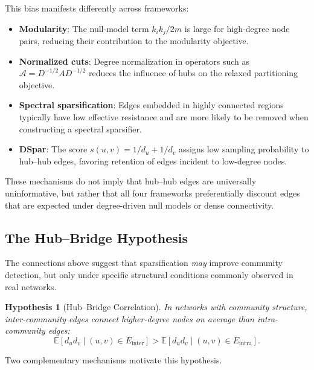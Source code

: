 \documentclass[10pt,journal,compsoc]{IEEEtran}
\newtheorem{hypothesis}{Hypothesis}
\begin{document}
This bias manifests differently across frameworks:
\begin{itemize}
    \item \textbf{Modularity}: The null-model term $k_i k_j / 2m$ is large for
    high-degree node pairs, reducing their contribution to the modularity
    objective.
    \item \textbf{Normalized cuts}: Degree normalization in operators such as
    $\mathcal{A} = D^{-1/2} A D^{-1/2}$ reduces the influence of hubs on the
    relaxed partitioning objective.
    \item \textbf{Spectral sparsification}: Edges embedded in highly connected
    regions typically have low effective resistance and are more likely to be
    removed when constructing a spectral sparsifier.
    \item \textbf{DSpar}: The score $s(u,v)=1/d_u+1/d_v$ assigns low sampling
    probability to hub--hub edges, favoring retention of edges incident to
    low-degree nodes.
\end{itemize}

These mechanisms do not imply that hub--hub edges are universally uninformative,
but rather that all four frameworks preferentially discount edges that are
expected under degree-driven null models or dense connectivity.

\subsection{The Hub--Bridge Hypothesis}
\label{sec:Hub-Bridge }

The connections above suggest that sparsification \emph{may} improve community
detection, but only under specific structural conditions commonly observed in
real networks.

\begin{hypothesis}[Hub--Bridge Correlation]
\label{hyp:hub-bridge}
In networks with community structure, inter-community edges connect
higher-degree nodes on average than intra-community edges:
\begin{equation}
\mathbb{E}\!\left[d_u d_v \mid (u,v)\in E_{\mathrm{inter}}\right]
>
\mathbb{E}\!\left[d_u d_v \mid (u,v)\in E_{\mathrm{intra}}\right].
\label{eq:hub-bridge}
\end{equation}
\end{hypothesis}

Two complementary mechanisms motivate this hypothesis.
\end{document}
